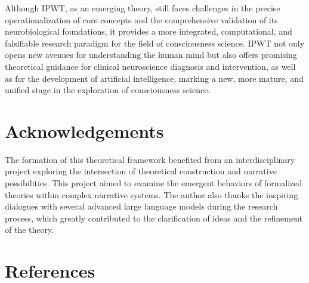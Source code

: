 \documentclass[
  a4paper]{article}
\begin{document}
Although IPWT, as an emerging theory, still faces challenges in the
precise operationalization of core concepts and the comprehensive
validation of its neurobiological foundations, it provides a more
integrated, computational, and falsifiable research paradigm for the
field of consciousness science. IPWT not only opens new avenues for
understanding the human mind but also offers promising theoretical
guidance for clinical neuroscience diagnosis and intervention, as well
as for the development of artificial intelligence, marking a new, more
mature, and unified stage in the exploration of consciousness science.

\section*{Acknowledgements}

The formation of this theoretical framework benefited from an interdisciplinary project exploring the intersection of theoretical construction and narrative possibilities. This project aimed to examine the emergent behaviors of formalized theories within complex narrative systems. The author also thanks the inspiring dialogues with several advanced large language models during the research process, which greatly contributed to the clarification of ideas and the refinement of the theory.

\section*{References}
\end{document}
